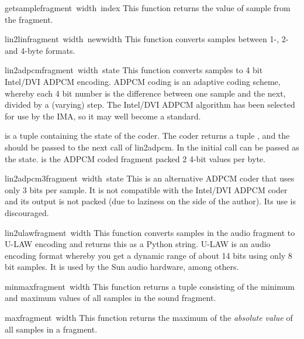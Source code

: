 \begin{funcdesc}{getsample}{fragment\, width\, index}
This function returns the value of sample  from the
fragment.
\end{funcdesc}

\begin{funcdesc}{lin2lin}{fragment\, width\, newwidth}
This function converts samples between 1-, 2- and 4-byte formats.
\end{funcdesc}

\begin{funcdesc}{lin2adpcm}{fragment\, width\, state}
This function converts samples to 4 bit Intel/DVI ADPCM encoding.
ADPCM coding is an adaptive coding scheme, whereby each 4 bit number
is the difference between one sample and the next, divided by a
(varying) step. The Intel/DVI ADPCM algorithm has been selected for
use by the IMA, so it may well become a standard.

 is a tuple containing the state of the coder. The coder
returns a tuple , and the
 should be passed to the next call of lin2adpcm.  In the
initial call  can be passed as the state.  is
the ADPCM coded fragment packed 2 4-bit values per byte.
\end{funcdesc}

\begin{funcdesc}{lin2adpcm3}{fragment\, width\, state}
This is an alternative ADPCM coder that uses only 3 bits per sample.
It is not compatible with the Intel/DVI ADPCM coder and its output is
not packed (due to laziness on the side of the author). Its use is
discouraged.
\end{funcdesc}

\begin{funcdesc}{lin2ulaw}{fragment\, width}
This function converts samples in the audio fragment to U-LAW encoding
and returns this as a Python string. U-LAW is an audio encoding format
whereby you get a dynamic range of about 14 bits using only 8 bit
samples. It is used by the Sun audio hardware, among others.
\end{funcdesc}

\begin{funcdesc}{minmax}{fragment\, width}
This function returns a tuple consisting of the minimum and maximum
values of all samples in the sound fragment.
\end{funcdesc}

\begin{funcdesc}{max}{fragment\, width}
This function returns the maximum of the {\em absolute value} of all
samples in a fragment.
\end{funcdesc}

